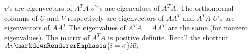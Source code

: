 \markdownRendererInterblockSeparator
{}\markdownRendererUlBegin
\markdownRendererUlItem $v$'s are eigenvectors of $A^TA$\markdownRendererUlItemEnd 
\markdownRendererUlItem $\sigma^2$'s are eigenvalues of $A^TA$.\markdownRendererUlItemEnd 
\markdownRendererUlItem The orthonormal columns of $U$ and $V$ respectively are eigenvectors of $AA^T$ and $A^TA$\markdownRendererUlItemEnd 
\markdownRendererUlItem $U$'s are eigenvectors of $AA^T$\markdownRendererUlItemEnd 
\markdownRendererUlItem The eigenvalues of $A^TA=AA^T$ are the same (for nonzero eigenvalues).\markdownRendererUlItemEnd 
\markdownRendererUlItem The matrix of $A^TA$ is positive definite.\markdownRendererUlItemEnd 
\markdownRendererUlItem Recall the shortcut $Av\markdownRendererEmphasis{i=\sigma}i \vec{u}_i$\markdownRendererUlItemEnd 
\markdownRendererUlEnd \relax